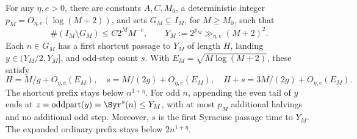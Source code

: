 \begin{lemma}
\label{lem:Shaik-high-two-sided}
For any \(\eta,e>0\), there are constants \(A,C,M_0\), a
deterministic integer \(p_M=O_{\eta,e}(\log(M+2))\), and sets
\(G_M\subseteq I_M\), for \(M\ge M_0\), such that
\[
 \#(I_M\setminus G_M)\le C2^M M^{-e},\qquad
 Y_M:=2^{p_M}\gg_{\eta,e}(M+2)^2.
\]
Each \(n\in G_M\) has a first shortcut passage to \(Y_M\) of
length \(H\), landing \(y\in(Y_M/2,Y_M]\), and odd-step count \(s\).
With \(E_M=\sqrt{M\log(M+2)}\), these satisfy
\begin{equation}\label{eq:Shaik-high-three-clocks}
 H=M/g+O_{\eta,e}(E_M),\quad
 s=M/(2g)+O_{\eta,e}(E_M),\quad
 H+s=3M/(2g)+O_{\eta,e}(E_M).
\end{equation}
The shortcut prefix stays below \(n^{1+\eta}\).
For odd \(n\), appending the even tail of \(y\) ends at
\(z=\operatorname{oddpart}(y)=\Syr^s(n)\le Y_M\), with at most
\(p_M\) additional halvings and no additional odd step.
Moreover, \(s\) is the first Syracuse passage time to \(Y_M\).
The expanded ordinary prefix stays below \(2n^{1+\eta}\).
\end{lemma}
